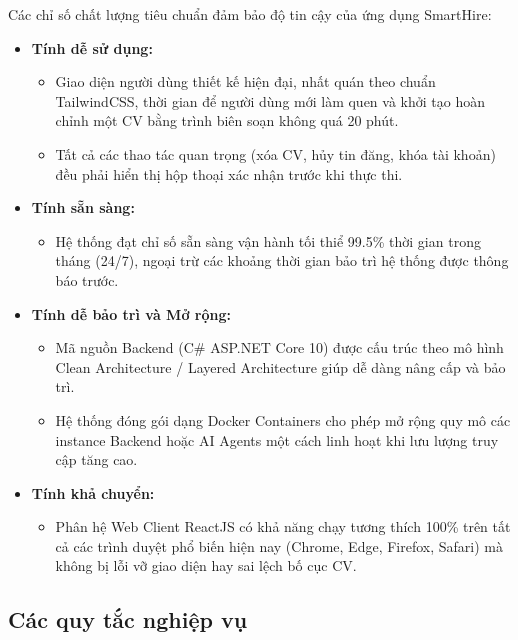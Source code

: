 Các chỉ số chất lượng tiêu chuẩn đảm bảo độ tin cậy của ứng dụng SmartHire:

\begin{itemize}
    \item \textbf{Tính dễ sử dụng:}
    \begin{itemize}
        \item Giao diện người dùng thiết kế hiện đại, nhất quán theo chuẩn TailwindCSS, thời gian để người dùng mới làm quen và khởi tạo hoàn chỉnh một CV bằng trình biên soạn không quá 20 phút.
        \item Tất cả các thao tác quan trọng (xóa CV, hủy tin đăng, khóa tài khoản) đều phải hiển thị hộp thoại xác nhận trước khi thực thi.
    \end{itemize}

    \item \textbf{Tính sẵn sàng:}
    \begin{itemize}
        \item Hệ thống đạt chỉ số sẵn sàng vận hành tối thiể 99.5\% thời gian trong tháng (24/7), ngoại trừ các khoảng thời gian bảo trì hệ thống được thông báo trước.
    \end{itemize}

    \item \textbf{Tính dễ bảo trì và Mở rộng:}
    \begin{itemize}
        \item Mã nguồn Backend (C\# ASP.NET Core 10) được cấu trúc theo mô hình Clean Architecture / Layered Architecture giúp dễ dàng nâng cấp và bảo trì.
        \item Hệ thống đóng gói dạng Docker Containers cho phép mở rộng quy mô các instance Backend hoặc AI Agents một cách linh hoạt khi lưu lượng truy cập tăng cao.
    \end{itemize}

    \item \textbf{Tính khả chuyển:}
    \begin{itemize}
        \item Phân hệ Web Client ReactJS có khả năng chạy tương thích 100\% trên tất cả các trình duyệt phổ biến hiện nay (Chrome, Edge, Firefox, Safari) mà không bị lỗi vỡ giao diện hay sai lệch bố cục CV.
    \end{itemize}
\end{itemize}

\subsection{Các quy tắc nghiệp vụ}

